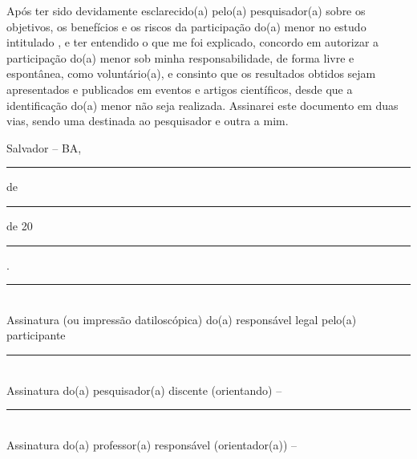 Após ter sido devidamente esclarecido(a) pelo(a) pesquisador(a) sobre os objetivos, os benefícios e os riscos da participação do(a) menor no estudo intitulado \imprimirtitulo, e ter entendido o que me foi explicado, concordo em autorizar a participação do(a) menor sob minha responsabilidade, de forma livre e espontânea, como voluntário(a), e consinto que os resultados obtidos sejam apresentados e publicados em eventos e artigos científicos, desde que a identificação do(a) menor não seja realizada. Assinarei este documento em duas vias, sendo uma destinada ao pesquisador e outra a mim.

\vspace{0.8cm}

\noindent Salvador -- BA, \rule{2cm}{0.4pt} de \rule{3cm}{0.4pt} de 20\rule{1cm}{0.4pt}.

\vspace{1.5cm}

\noindent\rule{9cm}{0.4pt}\\
Assinatura (ou impressão datiloscópica) do(a) responsável legal pelo(a) participante

\vspace{1.5cm}

\noindent\rule{9cm}{0.4pt}\\
Assinatura do(a) pesquisador(a) discente (orientando) -- \imprimirautor

\vspace{1.5cm}

\noindent\rule{9cm}{0.4pt}\\
Assinatura do(a) professor(a) responsável (orientador(a)) -- \imprimirorientador